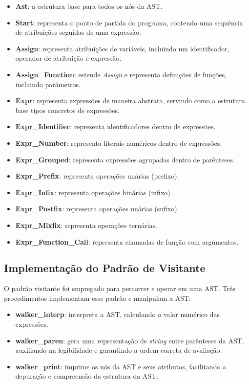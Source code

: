 \begin{itemize}
\item \textbf{Ast}: a estrutura base para todos os nós da AST.
\item \textbf{Start}: representa o ponto de partida do programa, contendo uma sequência de atribuições seguidas de uma expressão.
\item \textbf{Assign}: representa atribuições de variáveis, incluindo um identificador, operador de atribuição e expressão.
\item \textbf{Assign\_Function}: estende \textit{Assign} e representa definições de funções, incluindo parâmetros.
\item \textbf{Expr}: representa expressões de maneira abstrata, servindo como a estrutura base tipos concretos de expressões.
\item \textbf{Expr\_Identifier}: representa identificadores dentro de expressões.
\item \textbf{Expr\_Number}: representa literais numéricos dentro de expressões.
\item \textbf{Expr\_Grouped}: representa expressões agrupadas dentro de parênteses.
\item \textbf{Expr\_Prefix}: representa operações unárias (prefixo).
\item \textbf{Expr\_Infix}: representa operações binárias (infixo).
\item \textbf{Expr\_Postfix}: representa operações unárias (sufixo).
\item \textbf{Expr\_Mixfix}: representa operações ternárias.
\item \textbf{Expr\_Function\_Call}: representa chamadas de função com argumentos.


\end{itemize}


\subsection{Implementação do Padrão de Visitante}


O padrão visitante foi empregado para percorrer e operar em uma AST. Três procedimentos implementam esse padrão e manipulam a AST:


\begin{itemize}
  \item \textbf{walker\_interp}: interpreta a AST, calculando o valor numérico das expressões.
  \item \textbf{walker\_paren}: gera uma representação de \textit{string} entre parênteses da AST, auxiliando na legibilidade e garantindo a ordem correta de avaliação.
  \item \textbf{walker\_print}: imprime os nós da AST e seus atributos, facilitando a depuração e compreensão da estrutura da AST.
\end{itemize}


